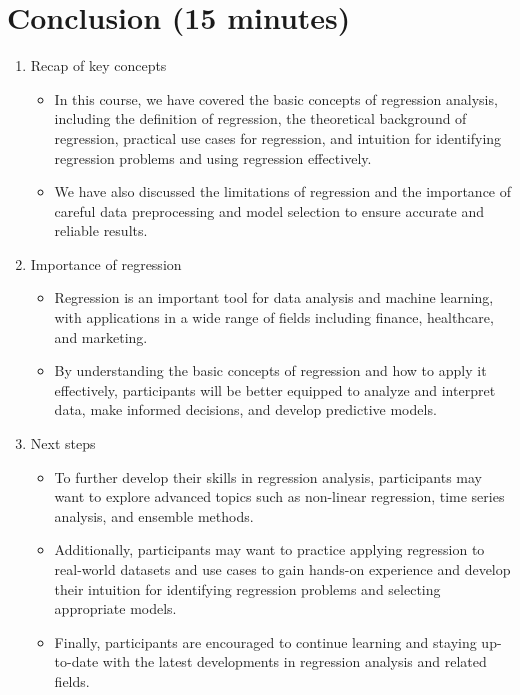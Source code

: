 \documentclass{article}
\begin{document}
\section{Conclusion (15 minutes)}
\begin{enumerate}[label=\alph*)]
\item Recap of key concepts
\begin{itemize}
\item In this course, we have covered the basic concepts of regression analysis, including the definition of regression, the theoretical background of regression, practical use cases for regression, and intuition for identifying regression problems and using regression effectively.
\item We have also discussed the limitations of regression and the importance of careful data preprocessing and model selection to ensure accurate and reliable results.
\end{itemize}

\item Importance of regression
\begin{itemize}
\item Regression is an important tool for data analysis and machine learning, with applications in a wide range of fields including finance, healthcare, and marketing.
\item By understanding the basic concepts of regression and how to apply it effectively, participants will be better equipped to analyze and interpret data, make informed decisions, and develop predictive models.
\end{itemize}

\item Next steps
\begin{itemize}
\item To further develop their skills in regression analysis, participants may want to explore advanced topics such as non-linear regression, time series analysis, and ensemble methods.
\item Additionally, participants may want to practice applying regression to real-world datasets and use cases to gain hands-on experience and develop their intuition for identifying regression problems and selecting appropriate models.
\item Finally, participants are encouraged to continue learning and staying up-to-date with the latest developments in regression analysis and related fields.
\end{itemize}
\end{enumerate}
\end{document}
